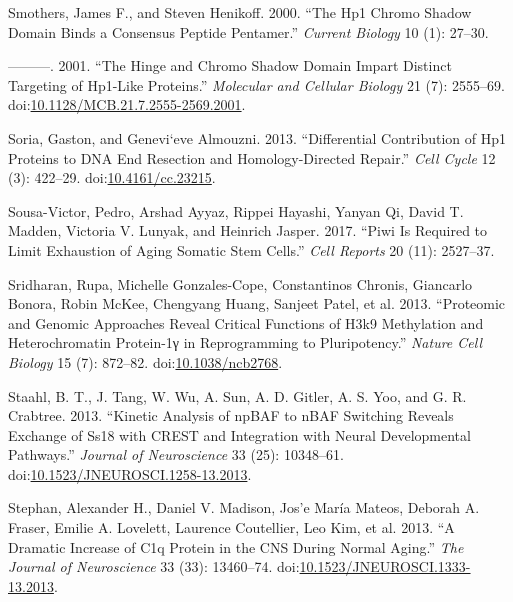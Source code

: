 \documentclass[onehalf,12pt]{beavtex}
\begin{document}
  \hypertarget{ref-SmothersHP1chromoshadow2000}{}
  Smothers, James F., and Steven Henikoff. 2000. ``The Hp1 Chromo Shadow
  Domain Binds a Consensus Peptide Pentamer.'' \emph{Current Biology} 10
  (1): 27--30.
  
  \hypertarget{ref-SmothersHingeChromoShadow2001}{}
  ---------. 2001. ``The Hinge and Chromo Shadow Domain Impart Distinct
  Targeting of Hp1-Like Proteins.'' \emph{Molecular and Cellular Biology}
  21 (7): 2555--69.
  doi:\href{https://doi.org/10.1128/MCB.21.7.2555-2569.2001}{10.1128/MCB.21.7.2555-2569.2001}.
  
  \hypertarget{ref-SoriaDifferentialcontributionHP12013a}{}
  Soria, Gaston, and Genevi\a`eve Almouzni. 2013. ``Differential
  Contribution of Hp1 Proteins to DNA End Resection and Homology-Directed
  Repair.'' \emph{Cell Cycle} 12 (3): 422--29.
  doi:\href{https://doi.org/10.4161/cc.23215}{10.4161/cc.23215}.
  
  \hypertarget{ref-Sousa-VictorPiwiRequiredLimit2017}{}
  Sousa-Victor, Pedro, Arshad Ayyaz, Rippei Hayashi, Yanyan Qi, David T.
  Madden, Victoria V. Lunyak, and Heinrich Jasper. 2017. ``Piwi Is
  Required to Limit Exhaustion of Aging Somatic Stem Cells.'' \emph{Cell
  Reports} 20 (11): 2527--37.
  
  \hypertarget{ref-SridharanProteomicgenomicapproaches2013}{}
  Sridharan, Rupa, Michelle Gonzales-Cope, Constantinos Chronis, Giancarlo
  Bonora, Robin McKee, Chengyang Huang, Sanjeet Patel, et al. 2013.
  ``Proteomic and Genomic Approaches Reveal Critical Functions of H3k9
  Methylation and Heterochromatin Protein-1γ in Reprogramming to
  Pluripotency.'' \emph{Nature Cell Biology} 15 (7): 872--82.
  doi:\href{https://doi.org/10.1038/ncb2768}{10.1038/ncb2768}.
  
  \hypertarget{ref-StaahlKineticAnalysisnpBAF2013}{}
  Staahl, B. T., J. Tang, W. Wu, A. Sun, A. D. Gitler, A. S. Yoo, and G.
  R. Crabtree. 2013. ``Kinetic Analysis of npBAF to nBAF Switching Reveals
  Exchange of Ss18 with CREST and Integration with Neural Developmental
  Pathways.'' \emph{Journal of Neuroscience} 33 (25): 10348--61.
  doi:\href{https://doi.org/10.1523/JNEUROSCI.1258-13.2013}{10.1523/JNEUROSCI.1258-13.2013}.
  
  \hypertarget{ref-StephanDramaticIncreaseC1q2013}{}
  Stephan, Alexander H., Daniel V. Madison, Jos\a'e María Mateos, Deborah
  A. Fraser, Emilie A. Lovelett, Laurence Coutellier, Leo Kim, et al.
  2013. ``A Dramatic Increase of C1q Protein in the CNS During Normal
  Aging.'' \emph{The Journal of Neuroscience} 33 (33): 13460--74.
  doi:\href{https://doi.org/10.1523/JNEUROSCI.1333-13.2013}{10.1523/JNEUROSCI.1333-13.2013}.
  
\end{document}
